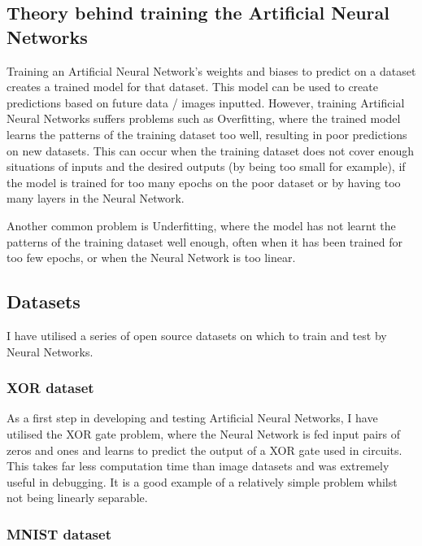 \documentclass[./project-report/src/latex/project-report.tex]{subfiles}
\begin{document}
\subsection{Theory behind training the Artificial Neural Networks}

Training an Artificial Neural Network's weights and biases to predict on a dataset creates a trained model for that dataset. This model can be used to create 
predictions based on future data / images inputted. However, training Artificial Neural Networks suffers problems such as Overfitting, where the trained model learns 
the patterns of the training dataset too well, resulting in poor predictions on new datasets. This can occur when the training dataset does not cover enough situations 
of inputs and the desired outputs (by being too small for example), if the model is trained for too many epochs on the poor dataset or by having too many layers in the 
Neural Network.

Another common problem is Underfitting, where the model has not learnt the patterns of the training dataset well enough, often when it has been trained for too few 
epochs, or when the Neural Network is too linear.

\subsection{Datasets}

I have utilised a series of open source datasets on which to train and test by Neural Networks.

\subsubsection{XOR dataset}

As a first step in developing and testing Artificial Neural Networks, I have utilised the XOR gate problem, where the Neural Network is fed input pairs of zeros and 
ones and learns  to predict the output of a XOR gate used in circuits. This takes far less computation time than image datasets and was extremely useful in debugging. 
It is a good example of a relatively simple problem whilst not being linearly separable.

\subsubsection{MNIST dataset}
\end{document}

